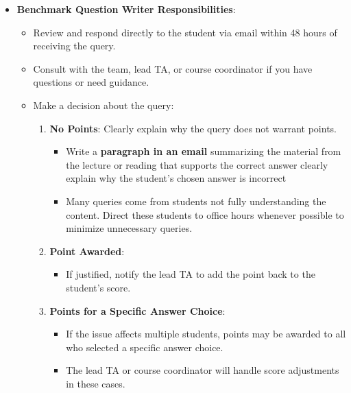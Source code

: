 \documentclass[
]{article}
\providecommand{\tightlist}{%
  \setlength{\itemsep}{0pt}\setlength{\parskip}{0pt}}
\begin{document}
\begin{itemize}
\tightlist
\item
  \textbf{Benchmark Question Writer Responsibilities}:

  \begin{itemize}
  \tightlist
  \item
    Review and respond directly to the student via email within 48 hours of receiving the query.\\
  \item
    Consult with the team, lead TA, or course coordinator if you have questions or need guidance.\\
  \item
    Make a decision about the query:

    \begin{enumerate}
    \def\labelenumi{\arabic{enumi}.}
    \tightlist
    \item
      \textbf{No Points}: Clearly explain why the query does not warrant points.

      \begin{itemize}
      \tightlist
      \item
        Write a \textbf{paragraph in an email} summarizing the material from the lecture or reading that supports the correct answer clearly explain why the student's chosen answer is incorrect
      \item
        Many queries come from students not fully understanding the content. Direct these students to office hours whenever possible to minimize unnecessary queries.\\
      \end{itemize}
    \item
      \textbf{Point Awarded}:

      \begin{itemize}
      \tightlist
      \item
        If justified, notify the lead TA to add the point back to the student's score.\\
      \end{itemize}
    \item
      \textbf{Points for a Specific Answer Choice}:

      \begin{itemize}
      \tightlist
      \item
        If the issue affects multiple students, points may be awarded to all who selected a specific answer choice.\\
      \item
        The lead TA or course coordinator will handle score adjustments in these cases.
      \end{itemize}
    \end{enumerate}
  \end{itemize}
\end{itemize}
\end{document}
